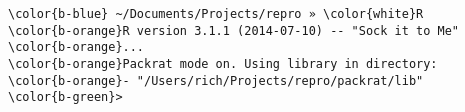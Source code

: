 \documentclass[class=minimal,border=0]{standalone}
\begin{document}
%
\begin{BVerbatim}[bgcolor=b-darkgrey]
\color{b-blue} ~/Documents/Projects/repro » \color{white}R
\color{b-orange}R version 3.1.1 (2014-07-10) -- "Sock it to Me"
\color{b-orange}...
\color{b-orange}Packrat mode on. Using library in directory:
\color{b-orange}- "/Users/rich/Projects/repro/packrat/lib"
\color{b-green}> 
\end{BVerbatim}
\end{document}
